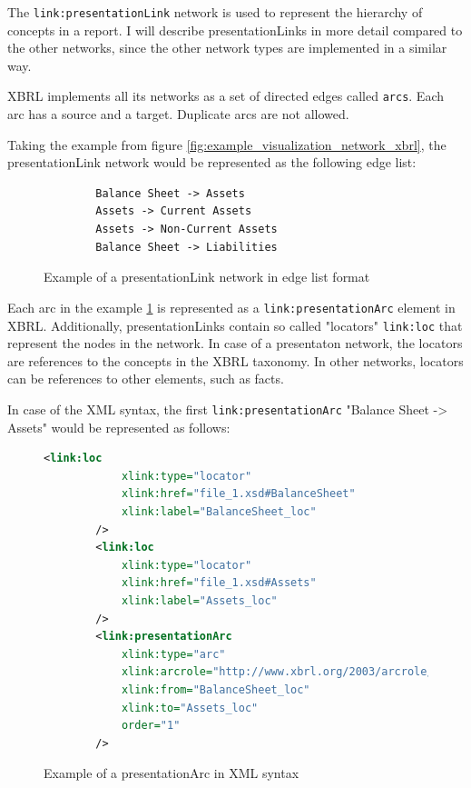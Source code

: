 The \texttt{link:presentationLink} network is used to represent the hierarchy of concepts in a report.
I will describe presentationLinks in more detail compared to the other networks, since the other network types are implemented in a similar way.

XBRL implements all its networks as a set of directed edges called \texttt{arcs}.
Each arc has a source and a target. Duplicate arcs are not allowed.

Taking the example from figure \ref{fig:example_visualization_network_xbrl}, the presentationLink network would be represented as the following edge list:

\begin{figure}[H]
    \caption{Example of a presentationLink network in edge list format}
    \label{fig:example_visualization_network_xbrl_edge_list}
    \begin{verbatim}
        Balance Sheet -> Assets
        Assets -> Current Assets
        Assets -> Non-Current Assets
        Balance Sheet -> Liabilities
    \end{verbatim}
\end{figure}

Each arc in the example \ref{fig:example_visualization_network_xbrl_edge_list} is represented as a \texttt{link:presentationArc} element in XBRL.
Additionally, presentationLinks contain so called "locators" \texttt{link:loc} that represent the nodes in the network.
In case of a presentaton network, the locators are references to the concepts in the XBRL taxonomy. 
In other networks, locators can be references to other elements, such as facts.

In case of the XML syntax, the first \texttt{link:presentationArc} "Balance Sheet -> Assets" would be represented as follows:

\begin{figure}[H]
    \begin{lstlisting}[language=XML]
        <link:loc 
            xlink:type="locator" 
            xlink:href="file_1.xsd#BalanceSheet"
            xlink:label="BalanceSheet_loc"
        />
        <link:loc 
            xlink:type="locator" 
            xlink:href="file_1.xsd#Assets"
            xlink:label="Assets_loc"
        />
        <link:presentationArc 
            xlink:type="arc" 
            xlink:arcrole="http://www.xbrl.org/2003/arcrole/parent-child" 
            xlink:from="BalanceSheet_loc" 
            xlink:to="Assets_loc"
            order="1"
        />
    \end{lstlisting}
    \caption{Example of a presentationArc in XML syntax}
    \label{fig:example_presentation_arc_xml}
\end{figure}

